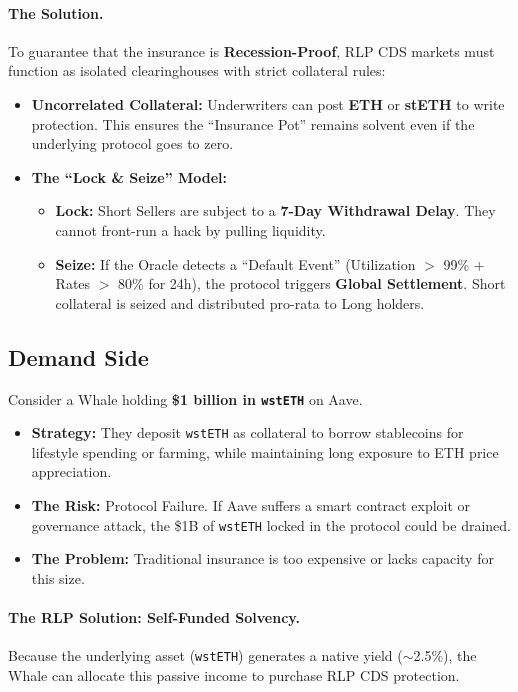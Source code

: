 \documentclass[12pt]{article}
\begin{document}
\paragraph{The Solution.}
To guarantee that the insurance is \textbf{Recession-Proof}, RLP CDS markets must function as isolated clearinghouses with strict collateral rules:

\begin{itemize}
    \item \textbf{Uncorrelated Collateral:} Underwriters can post \textbf{ETH} or \textbf{stETH} to write protection. This ensures the ``Insurance Pot'' remains solvent even if the underlying protocol goes to zero.
    \item \textbf{The ``Lock \& Seize'' Model:}
    \begin{itemize}
        \item \textbf{Lock:} Short Sellers are subject to a \textbf{7-Day Withdrawal Delay}. They cannot front-run a hack by pulling liquidity.
        \item \textbf{Seize:} If the Oracle detects a ``Default Event'' (Utilization $>$ 99\% + Rates $>$ 80\% for 24h), the protocol triggers \textbf{Global Settlement}. Short collateral is seized and distributed pro-rata to Long holders.
    \end{itemize}
\end{itemize}

\subsection{Demand Side}

Consider a Whale holding \textbf{\$1 billion in \texttt{wstETH}} on Aave.

\begin{itemize}
    \item \textbf{Strategy:} They deposit \texttt{wstETH} as collateral to borrow stablecoins for lifestyle spending or farming, while maintaining long exposure to ETH price appreciation.
    \item \textbf{The Risk:} Protocol Failure. If Aave suffers a smart contract exploit or governance attack, the \$1B of \texttt{wstETH} locked in the protocol could be drained.
    \item \textbf{The Problem:} Traditional insurance is too expensive or lacks capacity for this size.
\end{itemize}

\paragraph{The RLP Solution: Self-Funded Solvency.}
Because the underlying asset (\texttt{wstETH}) generates a native yield ($\sim$2.5\%), the Whale can allocate this passive income to purchase RLP CDS protection.
\end{document}
